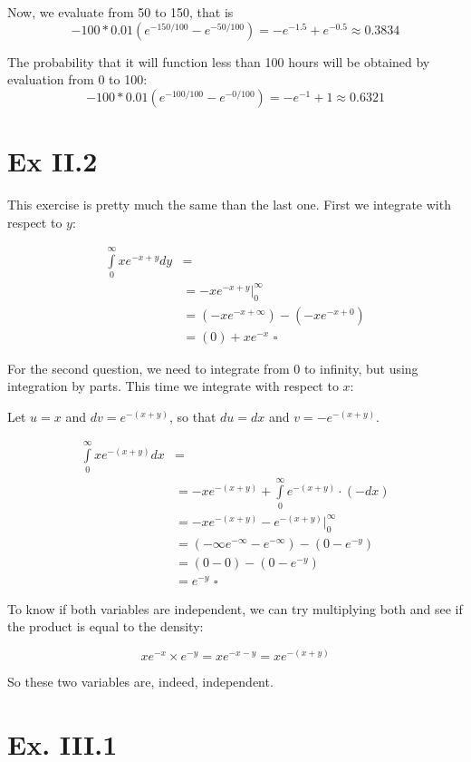 \documentclass[titlepage, letterpaper]{article}
\newcommand{\qed}{\,\,\square}
\begin{document}
Now, we evaluate from 50 to 150, that is
$$-100 * 0.01(e^{-150/100} - e^{-50/100}) = -e^{-1.5} + e^{-0.5} \approx 0.3834$$

The probability that it will function less than 100 hours will be obtained by evaluation from 0 to 100:
$$-100 * 0.01 (e^{-100/100} - e^{-0/100}) = -e^{-1} + 1 \approx 0.6321$$

\section{Ex II.2} %
\label{sec:ex_ii_2}
This exercise is pretty much the same than the last one.
First we integrate with respect to $y$:

\begin{align}
\int\limits_0^\infty xe^{-x+y}dy & = \\
& = -xe^{-x+y} \Big|_0^\infty \\[3ex]
& = (-xe^{-x+\infty}) - (-xe^{-x + 0}) \\
& = (0) + xe^{-x} \qed 
\end{align}

For the second question, we need to integrate from 0 to infinity, but using integration by parts.
This time we integrate with respect to $x$:

Let $u = x$ and $dv = e^{-(x+y)}$, so that $du = dx$ and $v = - e^{-(x+y)}$.

\begin{align}
\int\limits_0^\infty xe^{-(x+y)}dx & = \\
& = -xe^{-(x+y)} + \int\limits_0^\infty e^{-(x+y)}\cdot (-dx) \\
& = -xe^{-(x+y)} - e^{-(x+y)}\Big|_0^\infty \\[3ex]
& = (-\infty e^{-\infty} - e^{-\infty}) - (0 - e^{-y}) \\
& = (0 - 0) - (0 - e^{-y}) \\
& = e^{-y} \qed
\end{align}

To know if both variables are independent, we can try multiplying both and see if the product is equal to the density:

$$xe^{-x} \times e^{-y} = xe^{-x-y} = xe^{-(x+y)}$$

So these two variables are, indeed, independent.

\section{Ex. III.1} %
\label{sec:ex_iii_1}
\end{document}
